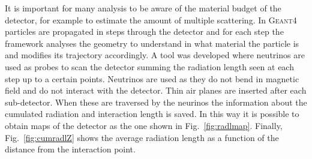 It is important for many analysis to be aware of the material budget of the detector, for example to estimate
the amount of multiple scattering. In \textsc{Geant4} particles are propagated in steps
through the detector and for each step the framework analyses the geometry to understand in what material
the particle is and modifies its trajectory accordingly. A tool was developed where neutrinos are
used as probes to scan the detector summing the radiation length seen at each step up to a certain points.
Neutrinos are used as they do not bend in magnetic field and do not interact with the detector.
Thin air planes are inserted after each sub-detector. When these are traversed by the neurinos the information
about the cumulated radiation and interaction length is saved. In this way it is possible to obtain maps of
the detector as the one shown in Fig.~\ref{fig:radlmap}. Finally, Fig.~\ref{fig:cumradlZ} shows the average
radiation length as a function of the distance from the interaction point.


